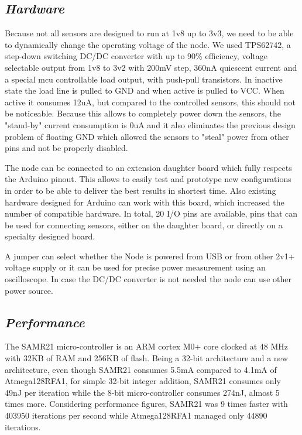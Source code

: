 \label{chap:arch}

\subsection{\textit{Hardware}}
Because not all sensors are designed to run at 1v8 up to 3v3, we need to be able to dynamically
change the operating voltage of the node. We used TPS62742, a step-down switching DC/DC converter
with up to 90\% efficiency, voltage selectable output from 1v8 to 3v2 with 200mV step, 360nA
quiescent current and a special mcu controllable load output, with push-pull transistors. In
inactive state the load line is pulled to GND and when active is pulled to VCC. When active it
consumes 12uA, but compared to the controlled sensors, this should not be noticeable. Because this
allows to completely power down the sensors, the "stand-by" current consumption is 0uA and it also
eliminates the previous design problem of floating GND which allowed the sensors to "steal" power
from other pins and not be properly disabled.

The node can be connected to an extension daughter board which fully respects the Arduino pinout.
This allows to easily test and prototype new configurations in order to be able to deliver the best
results in shortest time. Also existing hardware designed for Arduino can work with this board,
which increased the number of compatible hardware. In total, 20 I/O pins are available, pins that
can be used for connecting sensors, either on the daughter board, or directly on a specialty
designed board.

A jumper can select whether the Node is powered from USB or from other 2v1+ voltage supply or it can
be used for precise power measurement using an oscilloscope. In case the DC/DC converter is not
needed the node can use other power source.

\subsection{\textit{Performance}}

The SAMR21 micro-controller is an ARM cortex M0+ core clocked at 48 MHz with 32KB of RAM and 256KB
of flash. Being a 32-bit architecture and a new architecture, even though SAMR21 consumes 5.5mA
compared to 4.1mA of Atmega128RFA1, for simple 32-bit integer addition, SAMR21 consumes only 49nJ
per iteration while the 8-bit micro-controller consumes 274nJ, almost 5 times more. Considering
performance figures, SAMR21 was 9 times faster with 403950 iterations per second while
Atmega128RFA1 managed only 44890 iterations.

